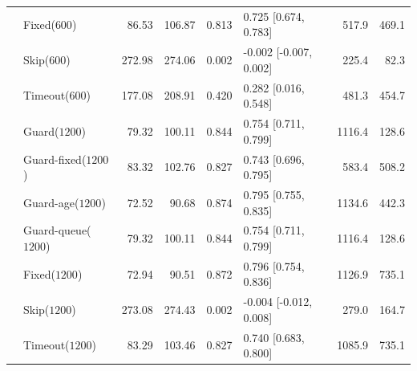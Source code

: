\documentclass[mathematics,supfile,submit,moreauthors]{Definitions/mdpi}
\newcommand{\devnum}[1]{#1}
\begin{document}
\begin{table}[p]
\begin{tabular}{llrrrlrr}
 & Fixed($\devnum{600}$)  & \devnum{86.53} & \devnum{106.87} & \devnum{0.813} & \devnum{0.725 [0.674, 0.783]} & \devnum{517.9} & \devnum{469.1} \\
 & Skip($\devnum{600}$)   & \devnum{272.98} & \devnum{274.06} & \devnum{0.002} & \devnum{-0.002 [-0.007, 0.002]} & \devnum{225.4} & \devnum{82.3} \\
 & Timeout($\devnum{600}$) & \devnum{177.08} & \devnum{208.91} & \devnum{0.420} & \devnum{0.282 [0.016, 0.548]} & \devnum{481.3} & \devnum{454.7} \\
 & Guard($\devnum{1200}$) & \devnum{79.32} & \devnum{100.11} & \devnum{0.844} & \devnum{0.754 [0.711, 0.799]} & \devnum{1116.4} & \devnum{128.6} \\
 & Guard-fixed($\devnum{1200}$) & \devnum{83.32} & \devnum{102.76} & \devnum{0.827} & \devnum{0.743 [0.696, 0.795]} & \devnum{583.4} & \devnum{508.2} \\
 & Guard-age($\devnum{1200}$) & \devnum{72.52} & \devnum{90.68} & \devnum{0.874} & \devnum{0.795 [0.755, 0.835]} & \devnum{1134.6} & \devnum{442.3} \\
 & Guard-queue($\devnum{1200}$) & \devnum{79.32} & \devnum{100.11} & \devnum{0.844} & \devnum{0.754 [0.711, 0.799]} & \devnum{1116.4} & \devnum{128.6} \\
 & Fixed($\devnum{1200}$) & \devnum{72.94} & \devnum{90.51} & \devnum{0.872} & \devnum{0.796 [0.754, 0.836]} & \devnum{1126.9} & \devnum{735.1} \\
 & Skip($\devnum{1200}$)  & \devnum{273.08} & \devnum{274.43} & \devnum{0.002} & \devnum{-0.004 [-0.012, 0.008]} & \devnum{279.0} & \devnum{164.7} \\
 & Timeout($\devnum{1200}$) & \devnum{83.29} & \devnum{103.46} & \devnum{0.827} & \devnum{0.740 [0.683, 0.800]} & \devnum{1085.9} & \devnum{735.1} \\
\bottomrule
\end{tabular}
\end{table}
\end{document}
